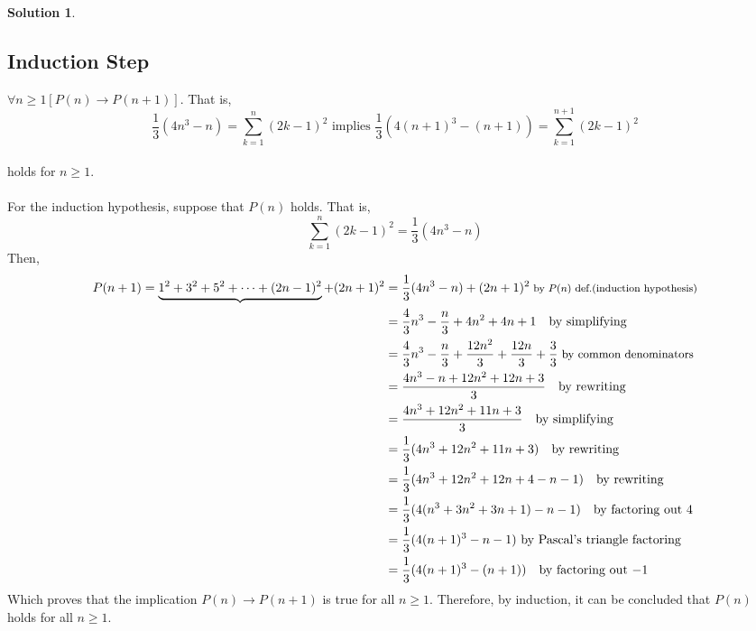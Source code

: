 \documentclass{article}
\theoremstyle{definition}
\newtheorem*{solution}{Solution}
\begin{document}
\begin{solution}
\subsection*{Induction Step}
$\forall n \geqslant 1[P(n) \rightarrow P(n+1)]$. That is,\\
$$\frac{1}{3} (4n^3 - n) = \sum_{k=1}^{n} (2k-1)^2 \mbox{ implies } \frac{1}{3}(4(n+1)^3 - (n+1)) = \sum_{k=1}^{n+1} (2k-1)^2$$\\
holds for $n \geqslant 1$.\\\\
For the induction hypothesis, suppose that $P(n)$ holds. That is,\\
$$\sum_{k=1}^{n} (2k-1)^2 = \frac{1}{3}(4n^3 - n)$$ Then,
\begin{align*}
P(n+1) = \underbrace{1^2 + 3^2+ 5^2 + \cdots + (2n-1)^2} + (2n+1)^2 &= \frac{1}{3}(4n^3-n) + (2n+1)^2 \mbox{\footnotesize{ by $P(n)$ def.(induction hypothesis)}}\\
&= \frac{4}{3}n^3 - \frac{n}{3} + 4n^2 + 4n + 1 \quad \mbox{by simplifying}\\
&= \frac{4}{3}n^3 - \frac{n}{3} + \frac{12n^2}{3} + \frac{12n}{3} + \frac{3}{3} \mbox{\small{ by common denominators}}\\
&= \frac{4n^3 - n +12n^2 + 12n + 3}{3} \quad \mbox{by rewriting}\\
&= \frac{4n^3 + 12n^2 + 11n + 3}{3} \quad \mbox{by simplifying}\\
&= \frac{1}{3} (4n^3 + 12n^2 + 11n + 3) \quad \mbox{by rewriting}\\
&= \frac{1}{3} (4n^3 + 12n^2 + 12n + 4 - n - 1) \quad \mbox{by rewriting}\\
&= \frac{1}{3} (4(n^3 + 3n^2 + 3n + 1) - n - 1) \quad \mbox{by factoring out $4$}\\
&= \frac{1}{3} (4(n+1)^3 - n - 1) \mbox{ by Pascal's triangle factoring}\\
&= \frac{1}{3} (4(n+1)^3 - (n+1)) \quad \mbox{by factoring out $-1$}
\end{align*}
Which proves that the implication $P(n) \rightarrow P(n+1)$ is true for all $n \geqslant 1$.
Therefore, by induction, it can be concluded that $P(n)$ holds for all $n \geqslant 1$.
\end{solution}
\end{document}

